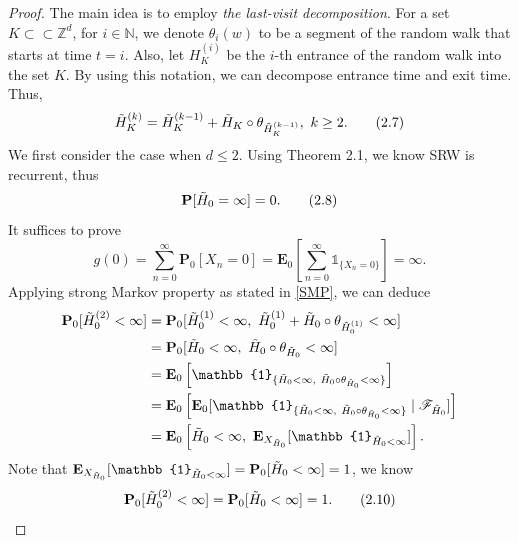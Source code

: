 \documentclass[
11pt, %
a4paper, %
oneside, %
headinclude,footinclude, %
BCOR5mm, %
]{scrartcl}
\begin{document}
\begin{proof}
    The main idea is to employ \textit{the last-visit decomposition}. For a set $K \subset\subset \mathbb{Z}^d$, for $i \in \mathbb{N}$, we denote $\theta_i(w)$ to be a segment of the random walk that starts at time $t=i$. Also, let $H_K^{(i)}$ be the $i$-th entrance of the random walk into the set $K$. By using this notation, we can decompose entrance time and exit time. Thus,
    \begin{equation}
        \Tilde{H}_K^{(k)}=\Tilde{H}_K^{(k-1)}+\Tilde{H}_K \circ \theta_{\Tilde{H}_K^{(k-1)}}, \ k \geq 2.\tag{2.7}
    \end{equation}
    We first consider the case when $d \leq 2$. Using Theorem 2.1, we know SRW is recurrent, thus
    \begin{equation}
        \mathbf{P}[\Tilde{H}_0= \infty]=0. \tag{2.8}
    \end{equation}
    It suffices to prove
    \begin{equation} g(0)=\sum^\infty_{n=0}\mathbf{P}_0[X_n=0]=\mathbf{E}_0\left[\sum^\infty_{n=0} \mathbb{1}_{\{X_n=0\}}\right]=\infty.\tag{2.9}
    \end{equation}
    Applying strong Markov property as stated in \ref{SMP}, we can deduce 
    \begin{align}
        \mathbf{P}_0[\Tilde{H}_0^{(2)}<\infty]&=\mathbf{P}_0[\Tilde{H}_0^{(1)}<\infty, \ \Tilde{H}_0^{(1)} + \Tilde{H}_0 \circ \theta_{\Tilde{H}_0^{(1)}}<\infty] \notag \\ 
        &=\mathbf{P}_0[\Tilde{H}_0<\infty, \ \Tilde{H}_0 \circ \theta_{\Tilde{H}_0}<\infty] \notag \\
        &=\mathbf{E}_0\left[\mathbb{1}_{\{\Tilde{H}_0<\infty, \ \Tilde{H}_0 \circ \theta_{\Tilde{H}_0}<\infty\} }\right] \notag \\ 
        &=\mathbf{E}_0 \left[ \mathbf{E}_0 [ \mathbb{1}_{\{\Tilde{H}_0<\infty, \ \Tilde{H}_0 \circ \theta_{\Tilde{H}_0}<\infty\} } \mid \mathscr{F}_{\Tilde{H}_0} ] \right] \notag \\ 
        &=\mathbf{E}_0 \left[ \Tilde{H}_0<\infty, \ \mathbf{E}_{X_{\Tilde{H}_0}} [ \mathbb{1}_{{\Tilde{H}_0<\infty}} ] \right]. \notag 
    \end{align}
    Note that $\mathbf{E}_{X_{\Tilde{H}_0}} [ \mathbb{1}_{{\Tilde{H}_0<\infty}} ]=\mathbf{P}_0[\Tilde{H}_0<\infty]=1$, we know 
    \begin{equation}
        \mathbf{P}_0[\Tilde{H}_0^{(2)}<\infty]=\mathbf{P}_0[\Tilde{H}_0<\infty]=1. \tag{2.10}
    \end{equation}

\end{proof}
\end{document}
